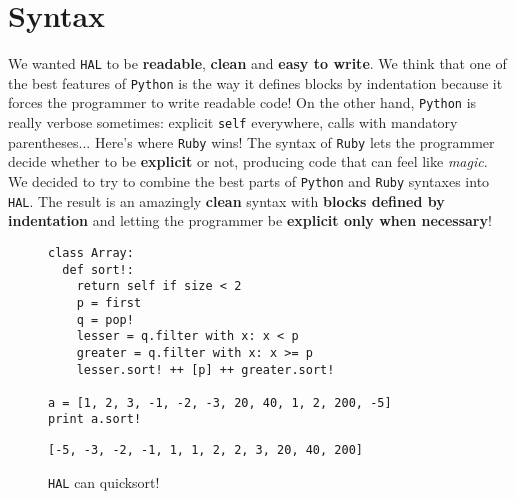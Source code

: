 \documentclass[a4paper,11pt]{article}
\begin{document}
\section{Syntax}
We wanted \texttt{HAL} to be \textbf{readable}, \textbf{clean} and \textbf{easy to write}. We think that one of the
  best features of \texttt{Python} is the way it defines blocks by indentation because it forces the programmer
  to write readable code! On the other hand, \texttt{Python} is really verbose sometimes: explicit \texttt{self} everywhere,
  calls with mandatory parentheses... Here's where \texttt{Ruby} wins! The syntax of \texttt{Ruby} lets the programmer
  decide whether to be \textbf{explicit} or not, producing code that can feel like \emph{magic}.
\\
We decided to try to combine the best parts of \texttt{Python} and \texttt{Ruby} syntaxes into \texttt{HAL}. The result
  is an amazingly \textbf{clean} syntax with \textbf{blocks defined by indentation} and letting the programmer
  be \textbf{explicit only when necessary}!
\begin{figure}[h!]
\begin{lstlisting}[language=hal]
class Array:
  def sort!:
    return self if size < 2
    p = first
    q = pop!
    lesser = q.filter with x: x < p
    greater = q.filter with x: x >= p
    lesser.sort! ++ [p] ++ greater.sort!

a = [1, 2, 3, -1, -2, -3, 20, 40, 1, 2, 200, -5]
print a.sort!
\end{lstlisting}
\begin{lstlisting}[language=output]
[-5, -3, -2, -1, 1, 1, 2, 2, 3, 20, 40, 200]
\end{lstlisting}
\caption{\texttt{HAL} can quicksort!}
\label{quicksort}
\end{figure}
\clearpage
\end{document}
